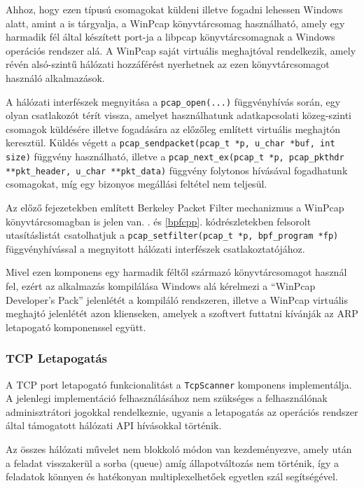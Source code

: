\documentclass[a4paper,12pt]{article}
\begin{document}
	Ahhoz, hogy ezen típusú csomagokat küldeni illetve fogadni lehessen Windows alatt, amint a \cite{xing10} is tárgyalja, a WinPcap könyvtárcsomag használható, amely egy harmadik fél által készített port-ja a libpcap könyvtárcsomagnak a Windows operációs rendszer alá. A WinPcap saját virtuális meghajtóval rendelkezik, amely révén alsó-szintű hálózati hozzáférést nyerhetnek az ezen könyvtárcsomagot használó alkalmazások.
	
	A hálózati interfészek megnyitása a \texttt{pcap_open(...)} függvényhívás során, egy olyan csatlakozót térít vissza, amelyet használhatunk adatkapcsolati közeg-szinti csomagok küldésére illetve fogadására az előzőleg említett virtuális meghajtón keresztül. Küldés végett a \texttt{pcap_sendpacket(pcap_t *p, u_char *buf, int size)} függvény használható, illetve a \texttt{pcap_next_ex(pcap_t *p, pcap_pkthdr **pkt_header, u_char **pkt_data)} függvény folytonos hívásával fogadhatunk csomagokat, míg egy bizonyos megállási feltétel nem teljesül.
	
	Az előző fejezetekben említett Berkeley Packet Filter mechanizmus a WinPcap könyvtárcsomagban is jelen van. \Az{\ref{bpfasm}}. és \ref{bpfcpp}. kódrészletekben felsorolt utasításlistát csatolhatjuk a \texttt{pcap_setfilter(pcap_t *p, bpf_program *fp)} függvényhívással a megnyitott hálózati interfészek csatlakoztatójához.
	
	Mivel ezen komponens egy harmadik féltől származó könyvtárcsomagot használ fel, ezért az alkalmazás kompilálása Windows alá kérelmezi a ``WinPcap Developer's Pack'' jelenlétét a kompiláló rendszeren, illetve a WinPcap virtuális meghajtó jelenlétét azon klienseken, amelyek a szoftvert futtatni kívánják az ARP letapogató komponenssel együtt.
	
\subsubsection{TCP Letapogatás} \label{ssec:tcpscan}

	A TCP port letapogató funkcionalitást a \texttt{TcpScanner} komponens implementálja. A jelenlegi implementáció felhasználásához nem szükséges a felhasználónak adminisztrátori jogokkal rendelkeznie, ugyanis a letapogatás az operációs rendszer által támogatott hálózati API hívásokkal történik.
	
	Az összes hálózati művelet nem blokkoló módon van kezdeményezve, amely után a feladat visszakerül a sorba (queue) amíg állapotváltozás nem történik, így a feladatok könnyen és hatékonyan multiplexelhetőek egyetlen szál segítségével.
\end{document}
